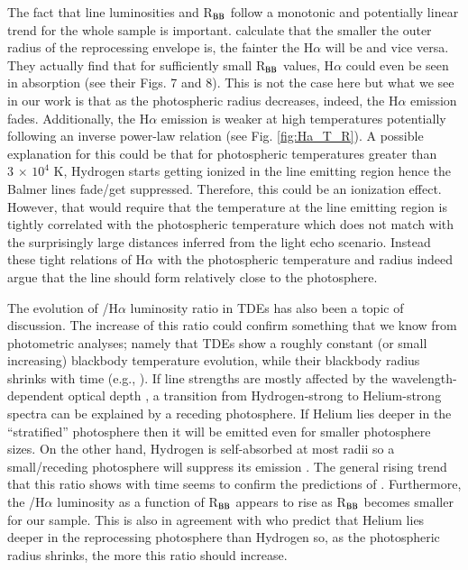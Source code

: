 \documentclass[structabstract]{aa}
\begin{document}
The fact that line luminosities and R$_{\rm BB}$ follow a monotonic and potentially linear trend for the whole sample is important. \citet{Roth2016} calculate that the smaller the outer radius of the reprocessing envelope is, the fainter the H$\alpha$ will be and vice versa. They actually find that for sufficiently small R$_{\rm BB}$ values, H$\alpha$ could even be seen in absorption (see their Figs. 7 and 8). This is not the case here but what we see in our work is that as the photospheric radius decreases, indeed, the H$\alpha$ emission fades. Additionally, the H$\alpha$ emission is weaker at high temperatures potentially following an inverse power-law relation (see Fig. \ref{fig:Ha_T_R}). A possible explanation for this could be that for photospheric temperatures greater than $3\,\times\,10^{4}$ K, Hydrogen starts getting ionized in the line emitting region hence the Balmer lines fade/get suppressed. Therefore, this could be an ionization effect. However, that would require that the temperature at the line emitting region is tightly correlated with the photospheric temperature which does not match with the surprisingly large distances inferred from the light echo scenario. Instead these tight relations of H$\alpha$ with the photospheric temperature and radius indeed argue that the line should form relatively close to the photosphere. 

The evolution of /H$\alpha$ luminosity ratio in TDEs has also been a topic of discussion. The increase of this ratio could confirm something that we know from photometric analyses; namely that TDEs show a roughly constant (or small increasing) blackbody temperature evolution, while their blackbody radius shrinks with time (e.g., \citealt{Holoien2018}). If line strengths are mostly affected by the wavelength-dependent optical depth \citep{Roth2016}, a transition from Hydrogen-strong to Helium-strong spectra can be explained by a receding photosphere. If Helium lies deeper in the ``stratified'' photosphere then it will be emitted even for smaller photosphere sizes. On the other hand, Hydrogen is self-absorbed at most radii so a small/receding photosphere will suppress its emission \citep{Nicholl2019}. The general rising trend that this ratio shows with time seems to confirm the predictions of \citet{Roth2016}. Furthermore, the /H$\alpha$ luminosity as a function of R$_{\rm BB}$ appears to rise as R$_{\rm BB}$ becomes smaller for our sample. This is also in agreement with \citet{Roth2016} who predict that Helium lies deeper in the reprocessing photosphere than Hydrogen so, as the photospheric radius shrinks, the more this ratio should increase. 
\end{document}
